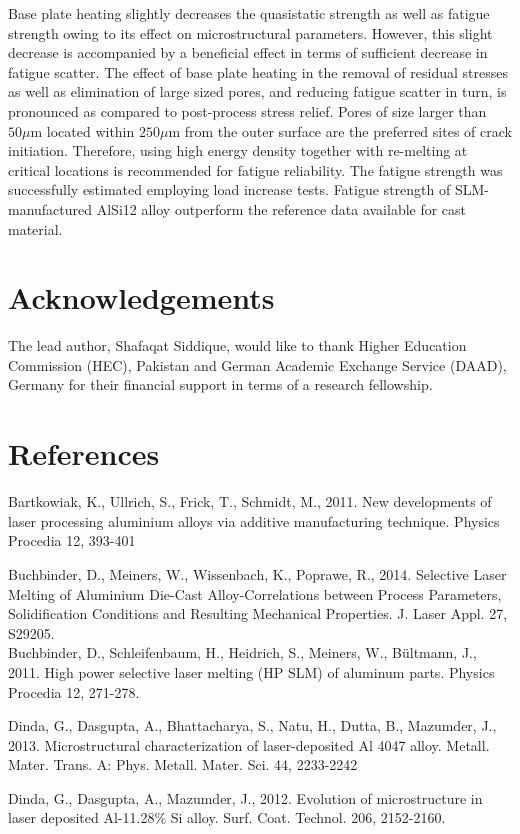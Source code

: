 \documentclass[10pt]{article}
\begin{document}
Base plate heating slightly decreases the quasistatic strength as well as fatigue strength owing to its effect on microstructural parameters. However, this slight decrease is accompanied by a beneficial effect in terms of sufficient decrease in fatigue scatter. The effect of base plate heating in the removal of residual stresses as well as elimination of large sized pores, and reducing fatigue scatter in turn, is pronounced as compared to post-process stress relief. Pores of size larger than $50 \mu \mathrm{m}$ located within $250 \mu \mathrm{m}$ from the outer surface are the preferred sites of crack initiation. Therefore, using high energy density together with re-melting at critical locations is recommended for fatigue reliability. The fatigue strength was successfully estimated employing load increase tests. Fatigue strength of SLM- manufactured AlSi12 alloy outperform the reference data available for cast material.

\section*{Acknowledgements}
The lead author, Shafaqat Siddique, would like to thank Higher Education Commission (HEC), Pakistan and German Academic Exchange Service (DAAD), Germany for their financial support in terms of a research fellowship.

\section*{References}
Bartkowiak, K., Ullrich, S., Frick, T., Schmidt, M., 2011. New developments of laser processing aluminium alloys via additive manufacturing technique. Physics Procedia 12, 393-401

Buchbinder, D., Meiners, W., Wissenbach, K., Poprawe, R., 2014. Selective Laser Melting of Aluminium Die-Cast Alloy-Correlations between Process Parameters, Solidification Conditions and Resulting Mechanical Properties. J. Laser Appl. 27, S29205.\\
Buchbinder, D., Schleifenbaum, H., Heidrich, S., Meiners, W., Bültmann, J., 2011. High power selective laser melting (HP SLM) of aluminum parts. Physics Procedia 12, 271-278.

Dinda, G., Dasgupta, A., Bhattacharya, S., Natu, H., Dutta, B., Mazumder, J., 2013. Microstructural characterization of laser-deposited Al 4047 alloy. Metall. Mater. Trans. A: Phys. Metall. Mater. Sci. 44, 2233-2242

Dinda, G., Dasgupta, A., Mazumder, J., 2012. Evolution of microstructure in laser deposited Al-11.28\% Si alloy. Surf. Coat. Technol. 206, 2152-2160.
\end{document}
